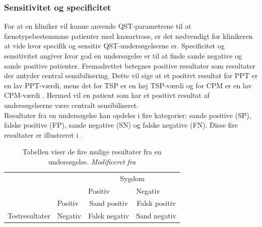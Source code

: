 \subsubsection{Sensitivitet og specificitet}
For at en kliniker vil kunne anvende QST-parametrene til at fænotypebestemmme patienter med knæartrose, er det nødvendigt for klinikeren at vide hvor specifik og sensitiv QST-undersøgelserne er. Specificitet og sensitivitet angiver hvor god en undersøgelse er til at finde sande negative og sande positive patienter. Fremadrettet betegnes positive resultater som resultater der antyder central sensibilisering. Dette vil sige at et positivt resultat for PPT er en lav PPT-værdi, mens det for TSP er en høj TSP-værdi og for CPM er en lav CPM-værdi \citep{Petersen2016}. Hermed vil en patient som har et positivt resultat af undersøgelserne være centralt sensibiliseret. \\
Resultater fra en undersøgelse kan opdeles i fire kategorier; sande positive (SP), falske positive (FP), sande negative (SN) og falske negative (FN). Disse fire resultater er illustreret i .

\begin{table}[]
\centering
\begin{tabular}{llcc}
\rowcolor[HTML]{C0C0C0} 
\cellcolor[HTML]{C0C0C0}                                 &         & \multicolumn{2}{c}{\cellcolor[HTML]{C0C0C0}Sygdom}        \\ \cline{2-4} 
\cellcolor[HTML]{C0C0C0}                                 &         & \multicolumn{1}{l}{Positiv} & \multicolumn{1}{l}{Negativ} \\
\cellcolor[HTML]{C0C0C0}                                 & Positiv & Sand positiv                & Falsk positiv               \\
\multirow{-4}{*}{\cellcolor[HTML]{C0C0C0}Testresultater} & Negativ & Falsk negativ               & Sand negativ               
\end{tabular}
\caption{Tabellen viser de fire mulige resultater fra en undersøgelse. \textit{Modificeret fra }}
\label{tab:pos_neg}
\end{table}

